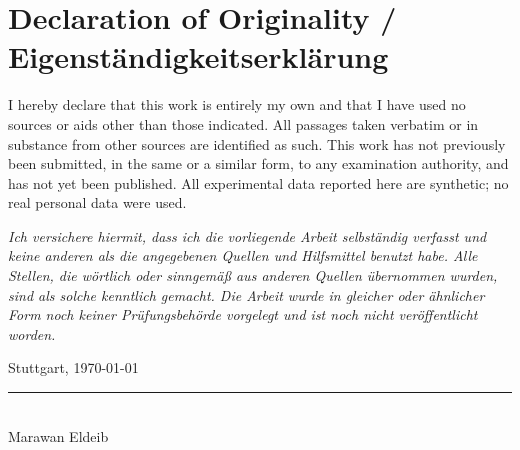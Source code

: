 \documentclass[10pt,conference,a4paper]{IEEEtran}
\begin{document}



\clearpage
\section*{Declaration of Originality \textnormal{/ Eigenst\"andigkeitserkl\"arung}}

\noindent I hereby declare that this work is entirely my own and that I have used no
sources or aids other than those indicated. All passages taken verbatim or in substance
from other sources are identified as such. This work has not previously been submitted,
in the same or a similar form, to any examination authority, and has not yet been
published. All experimental data reported here are synthetic; no real personal data were
used.

\medskip
\noindent\textit{Ich versichere hiermit, dass ich die vorliegende Arbeit selbst\"andig
verfasst und keine anderen als die angegebenen Quellen und Hilfsmittel benutzt habe. Alle
Stellen, die w\"ortlich oder sinngem\"a{\ss} aus anderen Quellen \"ubernommen wurden, sind
als solche kenntlich gemacht. Die Arbeit wurde in gleicher oder \"ahnlicher Form noch
keiner Pr\"ufungsbeh\"orde vorgelegt und ist noch nicht ver\"offentlicht worden.}

\vspace{1.5cm}
\noindent Stuttgart, \today

\vspace{1.5cm}
\noindent\rule{7cm}{0.4pt}\\
Marawan Eldeib
\end{document}
